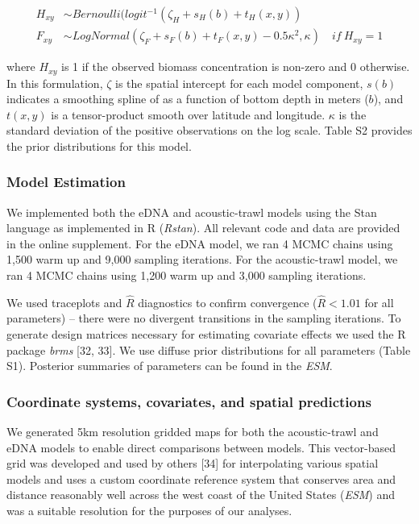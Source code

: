 \documentclass[
]{article}
\begin{document}
\begin{align}
  H_{xy} &\sim Bernoulli(logit^{-1}(\zeta_H + s_H(b) + t_H(x,y))\\
  F_{xy} &\sim LogNormal(\zeta_F + s_F(b) + t_F(x,y) - 0.5\kappa^2,\kappa) \quad  if \: H_{xy} = 1
\end{align}

where \(H_{xy}\) is 1 if the observed biomass concentration is non-zero
and 0 otherwise. In this formulation, \(\zeta\) is the spatial intercept
for each model component, \(s(b)\) indicates a smoothing spline of as a
function of bottom depth in meters (\(b\)), and \(t(x,y)\) is a
tensor-product smooth over latitude and longitude. \(\kappa\) is the
standard deviation of the positive observations on the log scale. Table S2 
provides the prior distributions for this model.

\hypertarget{model-estimation}{%
\subsubsection{Model Estimation}\label{model-estimation}}

We implemented both the eDNA and acoustic-trawl models using the Stan
language as implemented in R (\emph{Rstan}). All relevant
code and data are provided in the online supplement. For the eDNA model,
we ran 4 MCMC chains using 1,500 warm up and 9,000 sampling iterations.
For the acoustic-trawl model, we ran 4 MCMC chains using 1,200 warm up
and 3,000 sampling iterations.

We used traceplots and \(\hat{R}\) diagnostics to confirm convergence
(\(\hat{R} < 1.01\) for all parameters) -- there were no divergent
transitions in the sampling iterations. To generate design matrices
necessary for estimating covariate effects we used the R package
\emph{brms}  {[}32, 33{]}. We use diffuse prior distributions for all
parameters (Table S1). Posterior summaries of parameters can be found
in the \emph{ESM}.

\hypertarget{coordinate-systems-covariates-and-spatial-predictions}{%
\subsubsection{Coordinate systems, covariates, and spatial
predictions}\label{coordinate-systems-covariates-and-spatial-predictions}}

We generated 5km resolution gridded maps for both the acoustic-trawl and
eDNA models to enable direct comparisons between models. This
vector-based grid was developed and used by others {[}34{]} for
interpolating various spatial models and uses a custom coordinate
reference system that conserves area and distance reasonably well across
the west coast of the United States (\emph{ESM}) and was a suitable resolution for the purposes of our analyses.
\end{document}
